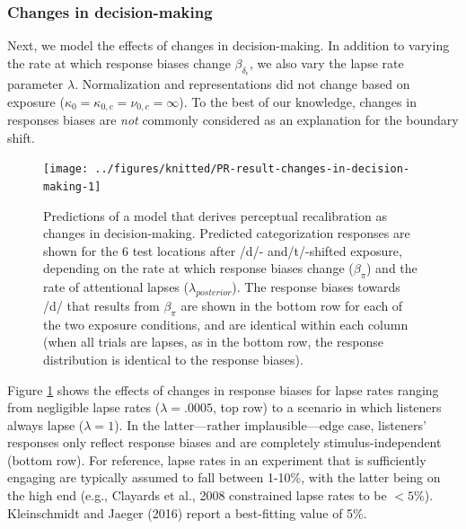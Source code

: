 \documentclass[
  11pt,
  man,floatsintext]{apa6}
\begin{document}
\hypertarget{changes-in-decision-making}{%
\subsubsection{Changes in decision-making}\label{changes-in-decision-making}}

Next, we model the effects of changes in decision-making. In addition to varying the rate at which response biases change \(\beta_{\delta_\epsilon}\), we also vary the lapse rate parameter \(\lambda\). Normalization and representations did not change based on exposure (\(\kappa_0 = \kappa_{0,c} = \nu_{0,c} = \infty\)). To the best of our knowledge, changes in responses biases are \emph{not} commonly considered as an explanation for the boundary shift.



\begin{figure}

{\centering \texttt{[image: ../figures/knitted/PR-result-changes-in-decision-making-1]} 

}

\caption{Predictions of a model that derives perceptual recalibration as changes in decision-making. Predicted categorization responses are shown for the 6 test locations after /d/- and/t/-shifted exposure, depending on the rate at which response biases change (\(\beta_{\pi}\)) and the rate of attentional lapses (\(\lambda_{posterior}\)). The response biases towards /d/ that results from \(\beta_{\pi}\) are shown in the bottom row for each of the two exposure conditions, and are identical within each column (when all trials are lapses, as in the bottom row, the response distribution is identical to the response biases).}\label{fig:PR-result-changes-in-decision-making}
\end{figure}

Figure \ref{fig:PR-result-changes-in-decision-making} shows the effects of changes in response biases for lapse rates ranging from negligible lapse rates (\(\lambda = .0005\), top row) to a scenario in which listeners always lapse (\(\lambda = 1\)). In the latter---rather implausible---edge case, listeners' responses only reflect response biases and are completely stimulus-independent (bottom row). For reference, lapse rates in an experiment that is sufficiently engaging are typically assumed to fall between 1-10\%, with the latter being on the high end (e.g., Clayards et al., 2008 constrained lapse rates to be \(<5\)\%). Kleinschmidt and Jaeger (2016) report a best-fitting value of 5\%.
\end{document}
